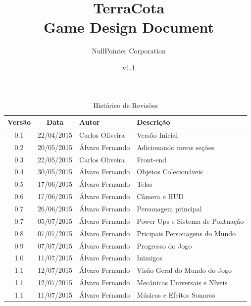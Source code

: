 \documentclass[12pt]{article}
\begin{document}
\title{TerraCota\\Game Design Document}
\author{NullPointer Corporation}
\date{v1.1}
\maketitle

\newpage

\begin{table}[h]
  \centering
  \begin{tabular}{ccll}
    \toprule
    \textbf{Versão} & \textbf{Data} & \textbf{Autor} & \textbf{Descrição} \\
    \midrule
    0.1 & 22/04/2015 & Carlos Oliveira  & Versão Inicial \\
    \rowcolor[gray]{0.9}
    0.2 & 20/05/2015 & Álvaro Fernando & Adicionando novas seções \\
    0.3 & 22/05/2015 & Carlos Oliveira & Front-end \\
    \rowcolor[gray]{0.9}
    0.4 & 30/05/2015 & Álvaro Fernando & Objetos Colecionáveis \\
    0.5 & 17/06/2015 & Álvaro Fernando & Telas \\
    \rowcolor[gray]{0.9}
    0.6 & 17/06/2015 & Álvaro Fernando & Câmera e HUD \\
    0.7 & 26/06/2015 & Álvaro Fernando & Personagem principal \\
    \rowcolor[gray]{0.9}
    0.7 & 05/07/2015 & Álvaro Fernando & Power Ups e Sistema de Pontuação \\
    0.8 & 07/07/2015 & Álvaro Fernando & Pricipais Personagens do Mundo \\
    \rowcolor[gray]{0.9}
    0.9 & 07/07/2015 & Álvaro Fernando & Progresso do Jogo \\
    1.0 & 11/07/2015 & Álvaro Fernando & Inimigos \\
    \rowcolor[gray]{0.9}
    1.1 & 12/07/2015 & Álvaro Fernando & Visão Geral do Mundo do Jogo \\
    1.1 & 12/07/2015 & Álvaro Fernando & Mecânicas Universais e Níveis \\
    \rowcolor[gray]{0.9}
    1.1 & 11/07/2015 & Álvaro Fernando & Músicas e Efeitos Sonoros \\
    \bottomrule
  \end{tabular}
  \caption{Histórico de Revisões}
\end{table}

\newpage

\tableofcontents
\end{document}
